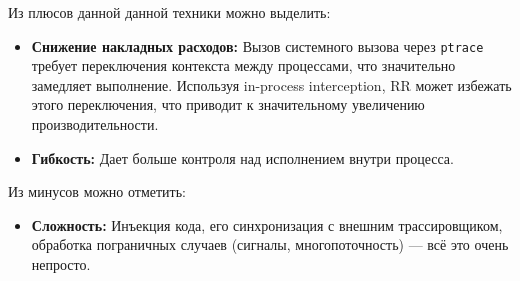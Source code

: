 Из плюсов данной данной техники можно выделить:
\begin{itemize}

  \item \textbf{Снижение накладных расходов: } Вызов системного вызова через
  \texttt{ptrace} требует переключения контекста между процессами, что
  значительно замедляет выполнение. Используя in-process interception, RR может
  избежать этого переключения, что приводит к значительному увеличению
  производительности.

  \item \textbf{Гибкость: } Дает больше контроля над исполнением внутри
  процесса.

\end{itemize}

Из минусов можно отметить:

\begin{itemize}

  \item \textbf{Сложность: } Инъекция кода, его синхронизация с внешним
  трассировщиком, обработка пограничных случаев (сигналы, многопоточность) ---
  всё это очень непросто.

\end{itemize}






